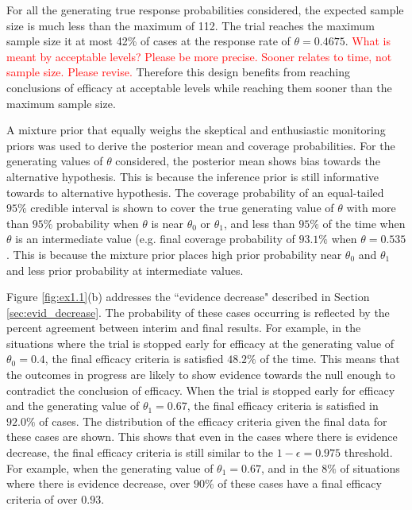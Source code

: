 \documentclass[useAMS,usenatbib,referee]{biom}
\begin{document}
For all the generating true response probabilities considered, the expected sample size is much less than the maximum of 112. The trial reaches the maximum sample size it at most 42\% of cases at the response rate of $\theta=0.4675$. 
\textcolor{red}{What is meant by acceptable levels? Please be more precise. Sooner relates to time, not sample size. Please revise.}
%
Therefore this design benefits from reaching conclusions of efficacy at acceptable levels while reaching them sooner than the maximum sample size.

A mixture prior that equally weighs the skeptical and enthusiastic monitoring priors was used to derive the posterior mean and coverage probabilities.
%
For the generating values of $\theta$ considered, the posterior mean shows bias towards the alternative hypothesis.
%
This is because the inference prior is still informative towards to alternative hypothesis.
%
The coverage probability of an equal-tailed $95\%$ credible interval is shown to cover the true generating value of $\theta$ with more than $95\%$ probability when $\theta$ is near $\theta_0$ or $\theta_1$, and less than $95\%$ of the time when $\theta$ is an intermediate value (e.g. final coverage probability of $93.1\%$ when $\theta=0.535$.
%
This is because the mixture prior places high prior probability near $\theta_0$ and $\theta_1$ and less prior probability at intermediate values.

Figure \ref{fig:ex1.1}(b) addresses the ``evidence decrease" described in Section \ref{sec:evid_decrease}.
%
The probability of these cases occurring is reflected by the percent agreement between interim and final results.
%
For example, in the situations where the trial is stopped early for efficacy at the generating value of $\theta_0=0.4$, the final efficacy criteria is satisfied $48.2\%$ of the time.
%
This means that the outcomes in progress are likely to show evidence towards the null enough to contradict the conclusion of efficacy.
%
When the trial is stopped early for efficacy and the generating value of $\theta_1=0.67$, the final efficacy criteria is satisfied in $92.0\%$ of cases.
%
The distribution of the efficacy criteria given the final data for these cases are shown.
%
This shows that even in the cases where there is evidence decrease, the final efficacy criteria is still similar to the $1-\epsilon=0.975$ threshold.
%
For example, when the generating value of $\theta_1=0.67$, and in the $8\%$ of situations where there is evidence decrease, over $90\%$ of these cases have a final efficacy criteria of over $0.93$.
%
\end{document}
